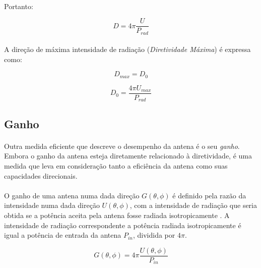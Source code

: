 \paragraph{}Portanto:

\begin{equation}
    D = 4\pi\frac{U}{P_{rad}}
    \label{32}
\end{equation}

\paragraph{}A direção de máxima intensidade de radiação (\textit{Diretividade Máxima}) é expressa como:

\begin{equation}
    D_{max} = D_0
    \label{33}
\end{equation}

\begin{equation}
    D_{0} = \frac{4\pi U_{max}}{P_{rad}}
    \label{34}
\end{equation}

\subsection{Ganho}

\paragraph{}Outra medida eficiente que descreve o desempenho da antena é o seu \textit{ganho}. Embora o ganho da antena esteja diretamente relacionado à diretividade, é uma medida que leva em consideração tanto a eficiência da antena como suas capacidades direcionais.

\paragraph{}O ganho de uma antena numa dada direção $G(\theta, \phi)$ é definido pela razão da intensidade numa dada direção $U(\theta, \phi)$, com a intensidade de radiação que seria obtida se a potência aceita pela antena fosse radiada isotropicamente \citep{balanis}. A intensidade de radiação correspondente a potência radiada isotropicamente é igual a potência de entrada da antena $P_{in}$, dividida por $4\pi$.

\begin{equation}
    G(\theta, \phi) = 4\pi\frac{U(\theta,\phi)}{P_{in}}
    \label{35}
\end{equation}

